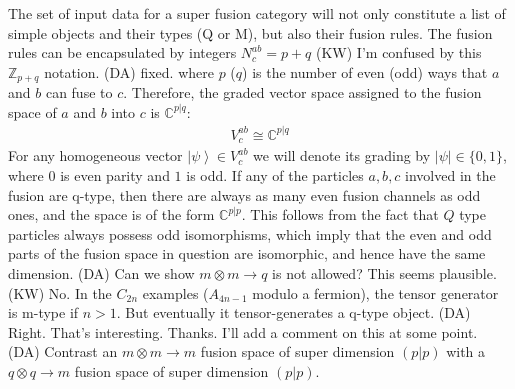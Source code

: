\documentclass[12pt,a4paper]{article}
\newcounter{arrow}
\newcommand{\tp}{\otimes}
\newcommand{\zz}{\mathbb{Z}}
\newcommand{\ket}[1]{\ensuremath{\left|#1\right\rangle}}
\newcommand{\dave}[1]{{\color{ao(english)}\footnotesize{(DA) #1}}}
\newcommand{\kw}[1]{{\color{kwcolor}\footnotesize{(KW) #1}}}
\begin{document}
The set of input data for a super fusion category will not only constitute a list of simple objects and their types (Q or M), but also their fusion rules. 
The fusion rules can be encapsulated by integers $N_c^{ab} = p+q$ 
\kw{I'm confused by this $\zz_{p+q}$ notation.}
\dave{fixed.}
where $p$ ($q$) is the number of even (odd) ways that $a$ and $b$ can fuse to $c$.
Therefore, the graded vector space assigned to the fusion space of $a$ and $b$ into $c$ is $\mathbb{C}^{p|q}$:
\begin{align}
V^{ab}_c \cong \mathbb{C}^{p|q}
\end{align}
For any homogeneous vector $\ket{\psi} \in V^{ab}_c$ 
we will denote its grading by $|\psi| \in \{ 0, 1\}$, where $0$ is even parity and $1$ is odd.
If any of the particles $a,b,c$ involved in the fusion are q-type, then there are always as many even fusion channels as odd ones, and the space is of the form $\mathbb{C}^{p|p}$.
This follows from the fact that $Q$ type particles always possess odd isomorphisms, which imply that the even and odd parts of the fusion space in question are isomorphic, and hence have the same dimension. 
\dave{Can we show $m \tp m \rightarrow q$ is not allowed? This seems plausible.}
\kw{No.  In the $C_{2n}$ examples ($A_{4n-1}$ modulo a fermion), the tensor generator is m-type if $n > 1$.
But eventually it tensor-generates a q-type object.}
\dave{Right. That's interesting. Thanks. I'll add a comment on this at some point.}
\dave{Contrast an $m \tp m \rightarrow m$ fusion space of super dimension $(p|p)$ with a $q \tp q \rightarrow m$ fusion space of super dimension $(p|p)$.}
\end{document}
